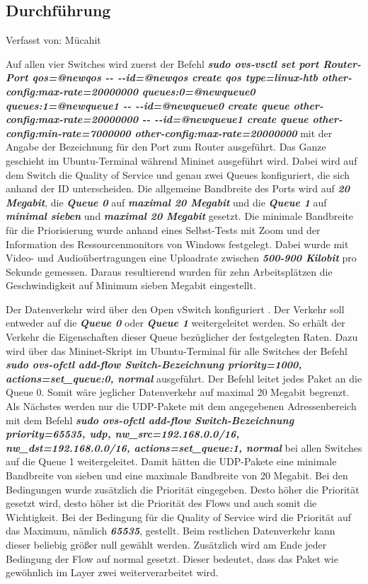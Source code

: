 \documentclass[fontsize=12pt,paper=a4,open=any,parskip=half,
  twoside=false,toc=listof,toc=bibliography,fleqn,leqno,
  captions=nooneline,captions=tableabove,british]{scrbook}
\begin{document}
\subsection{Durchführung}
{\tiny Verfasst von: Mücahit\par}
Auf allen vier Switches wird zuerst der Befehl \textit{\textbf{sudo ovs\hyp{}vsctl set port Router\hyp{}Port qos=@newqos \hyp{}\hyp{} \hyp{}\hyp{}id=@newqos create qos type=linux\hyp{}htb other\hyp{}config:max\hyp{}rate=20000000 queues:0=@newqueue0 queues:1=@newqueue1 \hyp{}\hyp{} \hyp{}\hyp{}id=@newqueue0 create queue other\hyp{}config:max\hyp{}rate=20000000 \hyp{}\hyp{} \hyp{}\hyp{}id=\linebreak{}@newqueue1 create queue other\hyp{}config:min\hyp{}rate=7000000 other\hyp{}config:max\hyp{}rate=20000000}} mit der Angabe der Bezeichnung für den Port zum Router ausgeführt. Das Ganze geschieht im Ubuntu\hyp{}Terminal während Mininet ausgeführt wird. Dabei wird auf dem Switch die Quality of Service und genau zwei Queues konfiguriert, die sich anhand der ID unterscheiden. Die allgemeine Bandbreite des Ports wird auf \textit{\textbf{20 Megabit}}, die \textit{\textbf{Queue 0}} auf \textit{\textbf{maximal 20 Megabit}} und die \textit{\textbf{Queue 1}} auf \textit{\textbf{minimal sieben}} und \textit{\textbf{maximal 20 Megabit}} gesetzt. Die minimale Bandbreite für die Priorisierung wurde anhand eines Selbst\hyp{}Tests mit Zoom und der Information des Ressourcenmonitors von Windows festgelegt. Dabei wurde mit Video\hyp{} und Audioübertragungen eine Uploadrate zwischen \textit{\textbf{500\hyp{}900 Kilobit}} pro Sekunde gemessen. Daraus resultierend wurden für zehn Arbeitsplätzen die Geschwindigkeit auf Minimum sieben Megabit eingestellt.\par
Der Datenverkehr wird über den Open vSwitch konfiguriert \cite{qospolicy}. Der Verkehr soll entweder auf die \textit{\textbf{Queue 0}} oder \textit{\textbf{Queue 1}} weitergeleitet werden. So erhält der Verkehr die Eigenschaften dieser Queue bezüglicher der festgelegten Raten. Dazu wird über das Mininet-Skript im Ubuntu-Terminal für alle Switches der Befehl \textit{\textbf{sudo ovs\hyp{}ofctl add\hyp{}flow Switch-Bezeichnung priority=1000, actions=set\_queue:0, normal}} ausgeführt. Der Befehl leitet jedes Paket an die Queue 0. Somit wäre jeglicher Datenverkehr auf maximal 20 Megabit begrenzt. Als Nächstes werden nur die UDP-Pakete mit dem angegebenen Adressenbereich mit dem Befehl \textit{\textbf{sudo ovs\hyp{}ofctl add\hyp{}flow Switch\hyp{}Bezeichnung priority=65535, udp, nw\_src=192.168.0.0/16, nw\_dst=192.168.0.0/16, actions=set\_queue:1, normal}} bei allen Switches auf die Queue 1 weitergeleitet. Damit hätten die UDP-Pakete eine minimale Bandbreite von sieben und eine maximale Bandbreite von 20 Megabit. Bei den Bedingungen wurde zusätzlich die Priorität eingegeben. Desto höher die Priorität gesetzt wird, desto höher ist die Priorität des Flows und auch somit die Wichtigkeit. Bei der Bedingung für die Quality of Service wird die Priorität auf das Maximum, nämlich \textit{\textbf{65535}}, gestellt. Beim restlichen Datenverkehr kann dieser beliebig größer null gewählt werden. Zusätzlich wird am Ende jeder Bedingung der Flow auf normal gesetzt. Dieser bedeutet, dass das Paket wie gewöhnlich im Layer zwei weiterverarbeitet wird.
\end{document}

